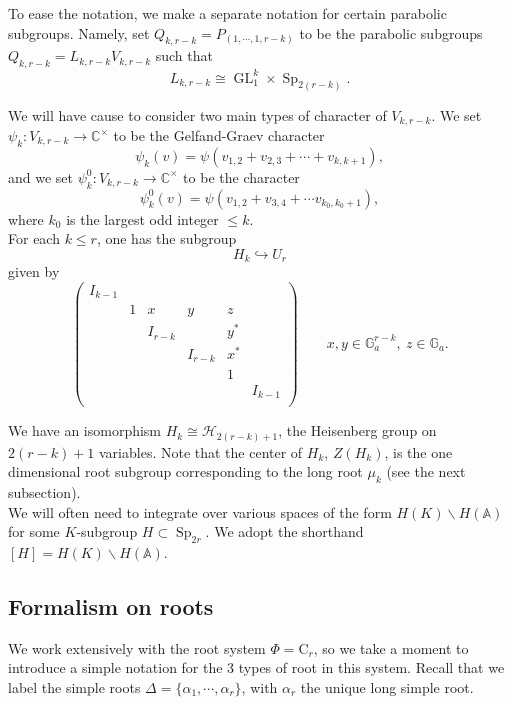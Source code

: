 \documentclass[11pt,reqno]{amsart}
\theoremstyle{definition}
\theoremstyle{remark}
\theoremstyle{definition}
\begin{document}
To ease the notation, we make a separate notation for certain parabolic subgroups. Namely, set $Q_{k,r-k} = P_{(1,\cdots,1, r-k)}$ to be the parabolic subgroups $Q_{k,r-k}=L_{k,r-k}V_{k,r-k}$ such that $$L_{k,r-k}\cong\operatorname{GL}_1^k\times \operatorname{Sp}_{2(r-k)}.$$

We will have cause to consider two main types of character of $V_{k,r-k}$. We set $\psi_k:V_{k,r-k}\to{\mathbb C}^\times$ to be the Gelfand-Graev character 
\[
\psi_k(v) = \psi(v_{1,2}+v_{2,3}+\cdots + v_{k,k+1}),
\]
and we set $\psi^0_k:V_{k,r-k}\to {\mathbb C}^\times$ to be the character
\[
\psi^0_k(v) = \psi(v_{1,2}+v_{3,4}+\cdots v_{k_0,k_0+1}),
\]
where $k_0$ is the largest odd integer $\leq k$.\\

For each $k\leq r$, one has the subgroup $$H_k {\hookrightarrow} U_r$$ given by
\[
  \left( \begin{array}{cccccc}
									I_{k-1}&&&&&\\
									&1&x&y&z&\\
									&&I_{r-k}&&y^*&\\
									&&&I_{r-k}&x^*&\\
									&&&&1&\\
									&&&&&I_{k-1}\\
\end{array}\right) \qquad x,y \in \mathbb{G}_a^{r-k}, \: z\in \mathbb{G}_a.
\]

We have an isomorphism $H_k \cong \mathcal{H}_{2(r-k)+1}$, the Heisenberg group on $2(r-k)+1$ variables. Note that the center of $H_k$, $Z(H_k)$, is the one dimensional root subgroup corresponding to the long root $\mu_k$ (see the next subsection).\\

We will often need to integrate over various spaces of the form $H(K){\backslash} H({\mathbb A})$ for some $K$-subgroup $H\subset \operatorname{Sp}_{2r}$. We adopt the shorthand $[H] =H(K){\backslash} H({\mathbb A})$. 

\subsection{Formalism on roots}

We work extensively with the root system $\Phi = \mathrm{C}_r$,  so we take a moment to introduce a simple notation for the 3 types of root in this system. Recall that we label the simple roots $\Delta = \{ {\alpha}_1,\cdots,{\alpha}_r\}$, with ${\alpha}_r$ the unique long simple root.
\end{document}
